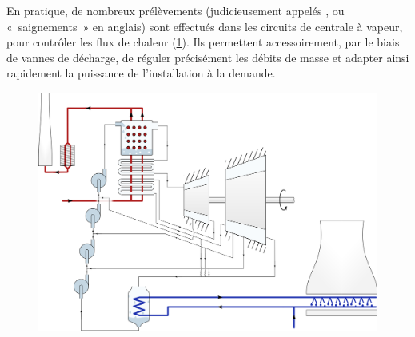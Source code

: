 		En pratique, de nombreux prélèvements (judicieusement appelés , ou «~saignements~» en anglais) sont effectués dans les circuits de centrale à vapeur, pour contrôler les flux de chaleur (\cref{fig_grosse_centrale_vapeur}). Ils permettent accessoirement, par le biais de vannes de décharge, de réguler précisément les débits de masse et adapter ainsi rapidement la puissance de l’installation à la demande.

		\begin{landscape}
		\begin{figure}
		 	\begin{center}
		 			\onlyframabook{\vspace{-1.5cm}}%
		 			\onlyamphibook{\vspace{-3.5cm}}%
				\centerline{\includegraphics[width=20cm]{images/circuit_complet.png}}
			\end{center}
			\label{fig_grosse_centrale_vapeur}
		\end{figure}
		\end{landscape}
